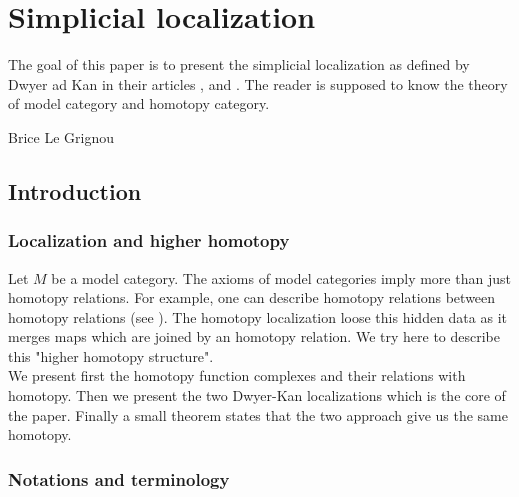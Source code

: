 \chapter{Simplicial localization}

\begin{refsection}

The goal of this paper is to present the simplicial localization as defined by Dwyer ad Kan in their articles \cite{dksimplicial}, \cite{dkcomputing} and \cite{dkfunction}. The reader is supposed to know the theory of model category and homotopy category.

\begin{flushright}
Brice Le Grignou
\end{flushright}

\section{Introduction}

\subsection{Localization and higher homotopy}

Let $M$ be a model category. The axioms of model categories imply more than just homotopy relations. For example, one can describe homotopy relations between homotopy relations (see \cite[2.3]{fromHAtoHAG}). The homotopy localization loose this hidden data as it merges maps which are joined by an homotopy relation. We try here to describe this "higher homotopy structure".\\

We present first the homotopy function complexes and their relations with homotopy. Then we present the two Dwyer-Kan localizations which is the core of the paper. Finally a small theorem states that the two approach give us the same homotopy.

\subsection{Notations and terminology}


\end{refsection}
